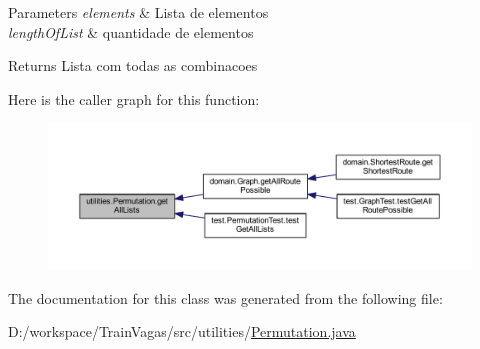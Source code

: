 \begin{DoxyParams}{Parameters}
{\em elements} & Lista de elementos \\
\hline
{\em length\+Of\+List} & quantidade de elementos \\
\hline
\end{DoxyParams}
\begin{DoxyReturn}{Returns}
Lista com todas as combinacoes 
\end{DoxyReturn}
Here is the caller graph for this function\+:\nopagebreak
\begin{figure}[H]
\begin{center}
\leavevmode
\includegraphics[width=350pt]{classutilities_1_1_permutation_a99314b491e989a85b57855baeb499b70_icgraph}
\end{center}
\end{figure}


The documentation for this class was generated from the following file\+:\begin{DoxyCompactItemize}
\item 
D\+:/workspace/\+Train\+Vagas/src/utilities/\hyperlink{_permutation_8java}{Permutation.\+java}\end{DoxyCompactItemize}
